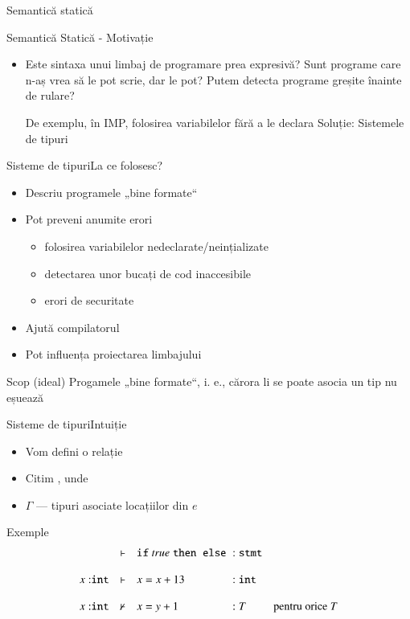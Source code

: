 \documentclass[xcolor=pdftex,romanian,colorlinks]{beamer}
\begin{document}
\begin{section}{Semantică statică}
  \begin{frame}{Semantică Statică - Motivație}
    \begin{itemize}
      \item Este sintaxa unui limbaj de programare prea expresivă?
    \vitem Sunt programe care n-aș vrea să le pot scrie, dar le pot?
    \vitem Putem detecta programe greșite înainte de rulare?

    De exemplu, în IMP, folosirea variabilelor fără a le declara
     Soluție: Sistemele de tipuri
    \end{itemize}
    \end{frame}

    \begin{frame}{Sisteme de tipuri}{La ce folosesc?}

    \begin{itemize}
    \item Descriu programele „bine formate“
    \item Pot preveni anumite erori
    \begin{itemize}
    \item folosirea variabilelor nedeclarate/neințializate
    \item detectarea unor bucați de cod inaccesibile
    \item erori de securitate
    \end{itemize}
    \item Ajută compilatorul
    \item Pot influența proiectarea limbajului
    \end{itemize}
    \vfill
    \begin{block}{Scop (ideal)}
    Progamele „bine formate“, i. e., cărora li se poate asocia un tip nu eșuează
    \end{block}
    \end{frame}
  \begin{frame}{Sisteme de tipuri}{Intuiție}
    \begin{itemize}
    \item Vom defini o relație 
    \item Citim , unde
    \item $\Gamma$ — tipuri asociate locațiilor din $e$
    \end{itemize}

    \begin{block}{Exemple}
    \[\begin{array}{lll@{\;:\;}ll}
    &\vdash& \Sif {\Strue} \Sthen {} \Selse {} & \terminal{stmt}
    \\\\
    x:\Sint&\vdash&x = x + 1 3& \Sint
    \\\\
    x:\Sint&\not\vdash&x = y +1 &T&\mbox{pentru orice } T
    \end{array}\]
    \end{block}
    \end{frame}


\end{section}
\end{document}
